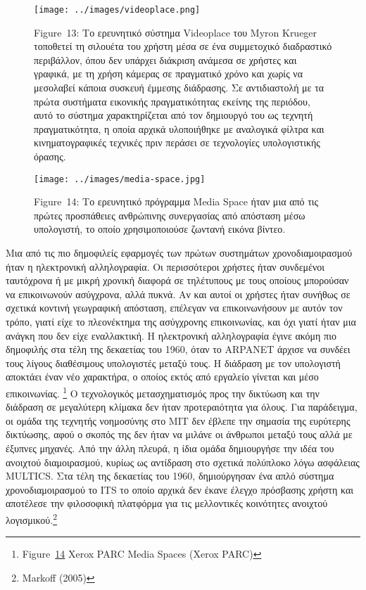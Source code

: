 \documentclass[
]{article}
\begin{document}
\leavevmode{}%
\begin{figure}
\hypertarget{fig:videoplace}{%
\centering
\texttt{[image: ../images/videoplace.png]}
\caption{Figure~13: Το ερευνητικό σύστημα Videoplace του Myron Krueger
τοποθετεί τη σιλουέτα του χρήστη μέσα σε ένα συμμετοχικό διαδραστικό
περιβάλλον, όπου δεν υπάρχει διάκριση ανάμεσα σε χρήστες και γραφικά, με
τη χρήση κάμερας σε πραγματικό χρόνο και χωρίς να μεσολαβεί κάποια
συσκευή έμμεσης διάδρασης. Σε αντιδιαστολή με τα πρώτα συστήματα
εικονικής πραγματικότητας εκείνης της περιόδου, αυτό το σύστημα
χαρακτηρίζεται από τον δημιουργό του ως τεχνητή πραγματικότητα, η οποία
αρχικά υλοποιήθηκε με αναλογικά φίλτρα και κινηματογραφικές τεχνικές
πριν περάσει σε τεχνολογίες υπολογιστικής όρασης.}\label{fig:videoplace}
}
\end{figure}

\leavevmode{}%
\begin{figure}
\hypertarget{fig:media-space}{%
\centering
\texttt{[image: ../images/media-space.jpg]}
\caption{Figure~14: Το ερευνητικό πρόγραμμα Media Space ήταν μια από τις
πρώτες προσπάθειες ανθρώπινης συνεργασίας από απόσταση μέσω υπολογιστή,
το οποίο χρησιμοποιούσε ζωντανή εικόνα βίντεο.}\label{fig:media-space}
}
\end{figure}

Μια από τις πιο δημοφιλείς εφαρμογές των πρώτων συστημάτων
χρονοδιαμοιρασμού ήταν η ηλεκτρονική αλληλογραφία. Οι περισσότεροι
χρήστες ήταν συνδεμένοι ταυτόχρονα ή με μικρή χρονική διαφορά σε
τηλέτυπους με τους οποίους μπορούσαν να επικοινωνούν ασύγχρονα, αλλά
πυκνά. Αν και αυτοί οι χρήστες ήταν συνήθως σε σχετικά κοντινή
γεωγραφική απόσταση, επέλεγαν να επικοινωνήσουν με αυτόν τον τρόπο,
γιατί είχε το πλεονέκτημα της ασύγχρονης επικοινωνίας, και όχι γιατί
ήταν μια ανάγκη που δεν είχε εναλλακτική. Η ηλεκτρονική αλληλογραφία
έγινε ακόμη πιο δημοφιλής στα τέλη της δεκαετίας του 1960, όταν το
ARPANET άρχισε να συνδέει τους λίγους διαθέσιμους υπολογιστές μεταξύ
τους. Η διάδραση με τον υπολογιστή αποκτάει έναν νέο χαρακτήρα, ο οποίος
εκτός από εργαλείο γίνεται και μέσο επικοινωνίας. \footnote{Figure~\protect\hyperlink{fig:media-space}{14}
  Xerox PARC Media Spaces (Xerox PARC)} Ο τεχνολογικός μετασχηματισμός
προς την δικτύωση και την διάδραση σε μεγαλύτερη κλίμακα δεν ήταν
προτεραιότητα για όλους. Για παράδειγμα, οι ομάδα της τεχνητής
νοημοσύνης στο ΜΙΤ δεν έβλεπε την σημασία της ευρύτερης δικτύωσης, αφού
ο σκοπός της δεν ήταν να μιλάνε οι άνθρωποι μεταξύ τους αλλά με έξυπνες
μηχανές. Από την άλλη πλευρά, η ίδια ομάδα δημιουργήσε την ιδέα του
ανοιχτού διαμοιρασμού, κυρίως ως αντίδραση στο σχετικά πολύπλοκο λόγω
ασφάλειας MULTICS. Στα τέλη της δεκαετίας του 1960, δημιούργησαν ένα
απλό σύστημα χρονοδιαμοιρασμού το ITS το οποίο αρχικά δεν έκανε έλεγχο
πρόσβασης χρήστη και αποτέλεσε την φιλοσοφική πλατφόρμα για τις
μελλοντικές κοινότητες ανοιχτού λογισμικού.\footnote{Markoff (2005)}
\end{document}

